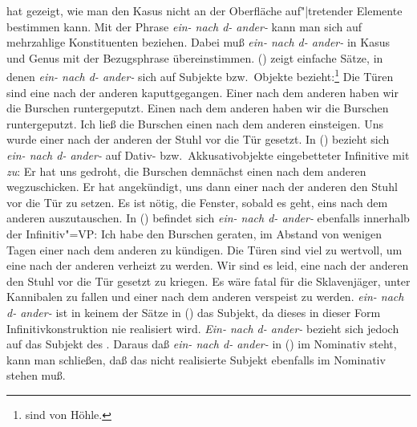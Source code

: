 \citet*[Kapitel~6]{Hoehle83a}
hat gezeigt, wie man den Kasus nicht an der Oberfläche
auf"|tretender Elemente bestimmen kann. Mit der Phrase \emph{ein- nach d- ander-} kann
man sich auf mehrzahlige Konstituenten beziehen. Dabei muß \emph{ein- nach d- ander-}
in Kasus und Genus mit der Bezugsphrase übereinstimmen.
() zeigt einfache Sätze, in denen \emph{ein- nach d- ander-} sich auf Subjekte bzw.\
Objekte bezieht:\footnote{
         sind von Höhle.
}
\eal
\label{bsp-tueren-hoehle}
\ex Die Türen sind eine nach der anderen kaputtgegangen.
\ex Einer nach dem anderen haben wir die Burschen runtergeputzt.
\ex Einen nach dem anderen haben wir die Burschen runtergeputzt.
\ex Ich ließ die Burschen einen nach dem anderen einsteigen.
\ex Uns wurde einer nach der anderen der Stuhl vor die Tür gesetzt.
\zl
In () bezieht sich \emph{ein- nach d- ander-} auf Dativ- bzw.\ Akkusativobjekte
eingebetteter Infinitive mit \emph{zu}:
\eal
\ex Er hat uns gedroht, die Burschen demnächst einen nach dem anderen wegzuschicken.
\ex Er hat angekündigt, uns dann einer nach der anderen den Stuhl vor die Tür zu setzen.
\ex Es ist nötig, die Fenster, sobald es geht, eins nach dem anderen auszutauschen.
\zl
In () befindet sich \emph{ein- nach d- ander-} ebenfalls innerhalb der Infinitiv"=VP:
\eal
\label{bsp-nominativ-inkoh}
\ex Ich habe den Burschen geraten, im Abstand von wenigen Tagen einer nach dem anderen
      zu kündigen.\label{bsp-nominativ-inkoh-geraten}
\ex Die Türen sind viel zu wertvoll, um eine nach der anderen verheizt zu werden.
\ex Wir sind es leid, eine nach der anderen den Stuhl vor die Tür gesetzt zu kriegen.
\ex Es wäre fatal für die Sklavenjäger, unter Kannibalen zu fallen und einer nach dem
      anderen verspeist zu werden.
\zl
\emph{ein- nach d- ander-} ist in keinem der Sätze in () das Subjekt,
da dieses in dieser
Form Infinitivkonstruktion nie realisiert wird. \emph{Ein- nach d- ander-} bezieht sich
jedoch auf das Subjekt des \zuis. Daraus daß \emph{ein- nach d- ander-} in (\mex{0}) im Nominativ
steht, kann man schließen, daß das nicht realisierte Subjekt ebenfalls im Nominativ
stehen muß.

